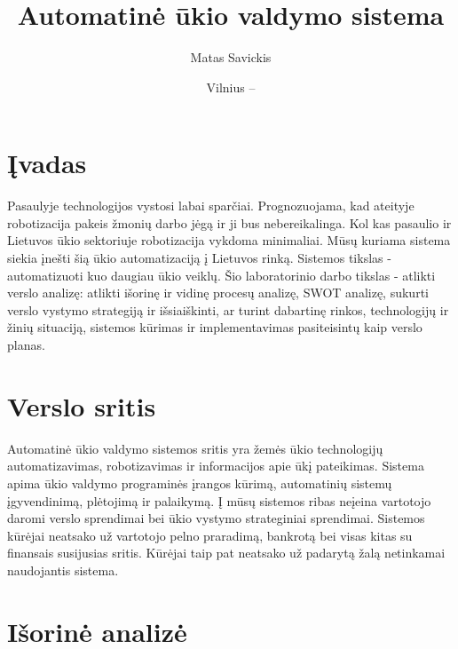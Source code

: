 \documentclass[oneside]{VUMIFPSkursinis}
\title{Automatinė ūkio valdymo sistema}
\author{Matas Savickis}
\date{Vilnius – \the\year}
\begin{document}
\maketitle
\tableofcontents


\section{Įvadas}
Pasaulyje technologijos vystosi labai sparčiai. Prognozuojama, kad ateityje robotizacija pakeis žmonių darbo jėgą ir ji bus nebereikalinga. Kol kas pasaulio ir Lietuvos ūkio sektoriuje robotizacija vykdoma minimaliai. Mūsų kuriama sistema siekia įnešti šią ūkio automatizaciją į Lietuvos rinką. Sistemos tikslas - automatizuoti kuo daugiau ūkio veiklų. Šio laboratorinio darbo tikslas - atlikti verslo analizę: atlikti išorinę ir vidinę procesų analizę, SWOT analizę, sukurti verslo vystymo strategiją ir išsiaiškinti, ar turint dabartinę rinkos, technologijų ir žinių situaciją, sistemos kūrimas ir implementavimas pasiteisintų kaip verslo planas.
\section{Verslo sritis}
	Automatinė ūkio valdymo sistemos sritis yra žemės ūkio technologijų automatizavimas, robotizavimas ir informacijos apie ūkį pateikimas. Sistema apima ūkio valdymo programinės įrangos kūrimą, automatinių sistemų įgyvendinimą, plėtojimą ir palaikymą. Į mūsų sistemos ribas neįeina vartotojo daromi verslo sprendimai bei ūkio vystymo strateginiai sprendimai. Sistemos kūrėjai neatsako už vartotojo pelno praradimą, bankrotą bei visas kitas su finansais susijusias sritis. Kūrėjai taip pat neatsako už padarytą žalą netinkamai naudojantis sistema.   

\section{Išorinė analizė}
\end{document}
